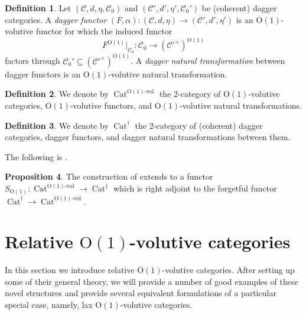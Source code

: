 \documentclass{article}
\newcommand{\Cat}{\operatorname{Cat}}%
\newcommand{\Oone}{\operatorname{O(1)}}
\newcommand{\C}{\mathcal{C}}
\numberwithin{equation}{section}
\theoremstyle{definition}
\newtheorem{definition}{Definition}[subsection]
\newtheorem{proposition}[definition]{Proposition}
\theoremstyle{theorem}
\begin{document}
\begin{definition}
    Let $(\C,d,\eta,\C_0)$ and $(\C',d',\eta',\C_0')$ be (coherent) dagger categories. A \emph{dagger functor}
    $(F,\alpha) \colon (\C,d,\eta) \to (\C',d',\eta')$ is an $\Oone$-volutive functor for which the induced functor 
    \begin{equation}
        F^{\Oone}|_{\C_0} \colon \C_0 \to (\C'^\times)^{\Oone}
    \end{equation}
    factors through $\C_0' \subseteq (\C'^\times)^{\Oone}$. A \emph{dagger natural transformation} between dagger functors is an 
    $\Oone$-volutive natural transformation.
\end{definition}
\begin{definition}
    We denote by $\Cat^{\Oone\text{-vol}}$ the 2-category of $\Oone$-volutive categories, $\Oone$-volutive functors, and $\Oone$-volutive natural transformations.
\end{definition}
\begin{definition}
    We denote by $\Cat^{\dagger}$ the 2-category of (coherent) dagger categories, dagger functors, and dagger natural transformations between them.
\end{definition}
The following is \cite[Theorem 4.9]{Stehouwer2023DaggerCV}.
\begin{proposition}
    The construction of  extends to a functor $S_{\Oone} \colon \Cat^{\Oone\text{-vol}} \to \Cat^{\dagger}$
    which is right adjoint to the forgetful functor $\Cat^{\dagger} \to \Cat^{\Oone\text{-vol}}$.
\end{proposition}

\section{Relative $\Oone$-volutive categories}\label{Section: Relative Oone volutive structures}
In this section we introduce relative $\Oone$-volutive categories. After setting up some of their general theory, we will provide a number of 
good examples of these novel structures and provide several equivalent formulations of a particular special case, namely, lax $\Oone$-volutive categories.
\end{document}

